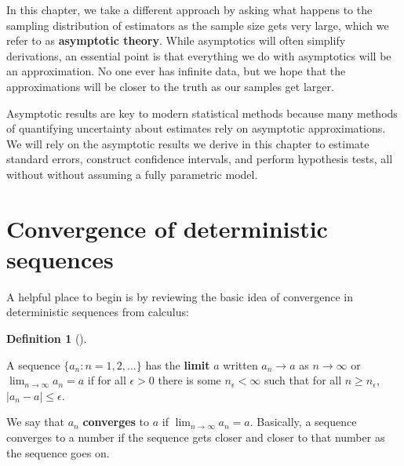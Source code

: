 \documentclass[
  letterpaper,
  DIV=11,
  numbers=noendperiod]{scrreprt}
\theoremstyle{plain}
\theoremstyle{definition}
\newtheorem{definition}{Definition}[chapter]
\theoremstyle{definition}
\theoremstyle{remark}
\begin{document}
In this chapter, we take a different approach by asking what happens to
the sampling distribution of estimators as the sample size gets very
large, which we refer to as \textbf{asymptotic theory}. While
asymptotics will often simplify derivations, an essential point is that
everything we do with asymptotics will be an approximation. No one ever
has infinite data, but we hope that the approximations will be closer to
the truth as our samples get larger.

Asymptotic results are key to modern statistical methods because many
methods of quantifying uncertainty about estimates rely on asymptotic
approximations. We will rely on the asymptotic results we derive in this
chapter to estimate standard errors, construct confidence intervals, and
perform hypothesis tests, all without without assuming a fully
parametric model.

\hypertarget{convergence-of-deterministic-sequences}{%
\section{Convergence of deterministic
sequences}\label{convergence-of-deterministic-sequences}}

A helpful place to begin is by reviewing the basic idea of convergence
in deterministic sequences from calculus:

\begin{definition}[]\protect\hypertarget{def-limit}{}\label{def-limit}

A sequence \(\{a_n: n = 1, 2, \ldots\}\) has the \textbf{limit} \(a\)
written \(a_n \rightarrow a\) as \(n\rightarrow \infty\) or
\(\lim_{n\rightarrow \infty} a_n = a\) if for all \(\epsilon > 0\) there
is some \(n_{\epsilon} < \infty\) such that for all
\(n \geq n_{\epsilon}\), \(|a_n - a| \leq \epsilon\).

\end{definition}

We say that \(a_n\) \textbf{converges} to \(a\) if
\(\lim_{n\rightarrow\infty} a_n = a\). Basically, a sequence converges
to a number if the sequence gets closer and closer to that number as the
sequence goes on.
\end{document}
